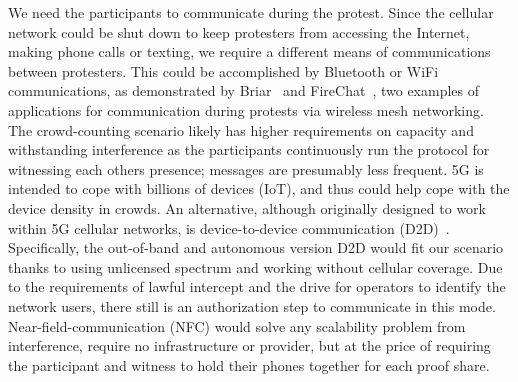 We need the participants to communicate during the protest.
Since the cellular network could be shut down to keep protesters from accessing 
the Internet, making phone calls or texting, we require a different means of 
communications between protesters. This could be accomplished by Bluetooth or 
WiFi communications, as demonstrated by Briar~\cite{Briar} and 
FireChat~\cite{FireChat}, two examples of applications for communication during 
protests via wireless mesh networking. The crowd-counting scenario likely has 
higher requirements on capacity and withstanding interference as the 
participants continuously run the protocol for witnessing each others presence; 
messages are presumably less frequent. 5G is intended to cope with billions of 
devices (IoT), and thus could help cope with the device density in crowds.
An alternative, although originally designed to work within 5G cellular networks, is device-to-device communication (D2D)~\cite{D2D}. 
Specifically, the out-of-band and autonomous version D2D would fit our
scenario thanks to using unlicensed spectrum and working without
cellular coverage. Due to the requirements of lawful intercept and the
drive for operators to identify the network users, there still is an
authorization step to communicate in this
mode. Near-field-communication (NFC) would
solve any scalability problem from interference, require no
infrastructure or provider, but at the price of requiring the
participant and witness to hold their phones together for each proof
share. 
